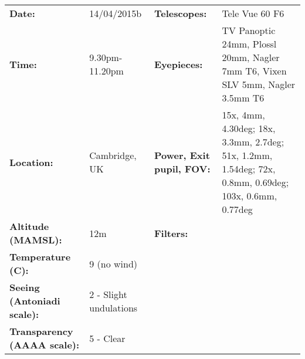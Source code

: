 \begin{tabular}{ p{1.7in} p{1.2in} p{1.5in} p{4.2in}}
{\bf Date:} & 14/04/2015b & {\bf Telescopes:} & Tele Vue 60 F6 \\ 
{\bf Time:} & 9.30pm-11.20pm & {\bf Eyepieces:} & TV Panoptic 24mm, Plossl 20mm, Nagler 7mm T6, Vixen SLV 5mm, Nagler 3.5mm T6 \\ 
{\bf Location:} & Cambridge, UK & {\bf Power, Exit pupil, FOV:} & 15x, 4mm, 4.30deg; 18x, 3.3mm, 2.7deg; 51x, 1.2mm, 1.54deg; 72x, 0.8mm, 0.69deg; 103x, 0.6mm, 0.77deg \\ 
{\bf Altitude (MAMSL):} & 12m & {\bf Filters:} &  \\ 
{\bf Temperature (C):} & 9 (no wind) & & \\ 
{\bf Seeing (Antoniadi scale):} & 2 - Slight undulations & & \\ 
{\bf Transparency (AAAA scale):} & 5 - Clear & & \\ 
\end{tabular}
\centering 
